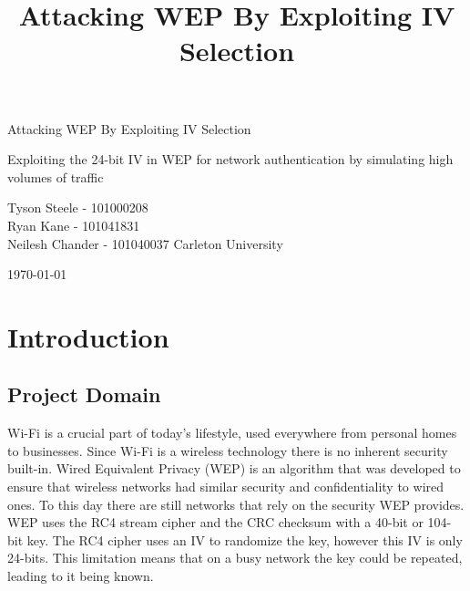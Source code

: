 \documentclass[10pt, titlepage]{article}
\begin{document}
\title{Attacking WEP By Exploiting IV Selection}


\begin{titlepage}
	\centering
	\vspace{3cm} \par
	\huge Attacking WEP By Exploiting IV Selection \par
	\large Exploiting the 24-bit IV in WEP for network authentication by simulating high volumes of traffic\par
	\vspace{8cm} \par
	Tyson Steele - 101000208\\
	Ryan Kane - 101041831\\
	Neilesh Chander - 101040037
	\vfill
	\large Carleton University \par
	\large \today\par
\end{titlepage}
\newpage

\tableofcontents
\newpage

\listoffigures
\newpage

\listoftables
\newpage

\section{Introduction}

\subsection{Project Domain}
Wi-Fi is a crucial part of today’s lifestyle, used everywhere from personal homes to businesses. Since Wi-Fi is a wireless technology there is no inherent security built-in. Wired Equivalent Privacy (WEP) is an algorithm that was developed to ensure that wireless networks had similar security and confidentiality to wired ones. To this day there are still networks that rely on the security WEP provides. WEP uses the RC4 stream cipher and the CRC checksum with a 40-bit or 104-bit key. The RC4 cipher uses an IV to randomize the key, however this IV is only 24-bits. This limitation means that on a busy network the key could be repeated, leading to it being known.
\end{document}
